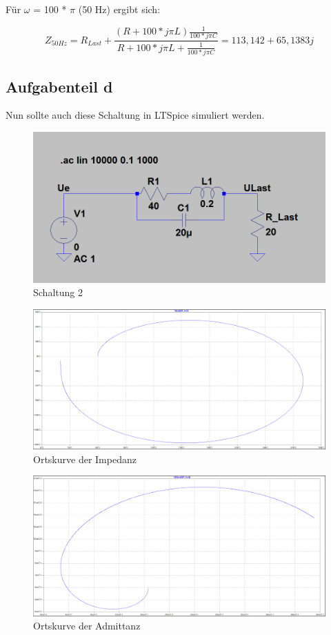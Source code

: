 \documentclass[%
  a4paper, %
  12pt, %
   article, %
  titlepage
]{scrartcl}
\begin{document}
Für $\omega$ = 100 * $\pi$ (50 Hz) ergibt sich:

\begin{equation}
Z_{50Hz}=R_{Last}+\frac{(R+100*j\pi L)\frac{1}{100*j\pi C}}{R+100*j\pi L+\frac{1}{100*j\pi C}} = 113,142 + 65,1383 j
\end{equation}


\subsection{Aufgabenteil d}
Nun sollte auch diese Schaltung in LTSpice simuliert werden.

\begin{figure}[h]
\includegraphics[width=\textwidth]{schematic3.png}
\caption{Schaltung 2}
\label{fig7}
\end{figure}

\clearpage

\begin{figure}[h]
\includegraphics[width=\textwidth]{plot2.png}
\caption{Ortskurve der Impedanz}
\label{fig8}
\end{figure}

\begin{figure}[h]
\includegraphics[width=\textwidth]{plot3.png}
\caption{Ortskurve der Admittanz}
\label{fig9}
\end{figure}
\end{document}
